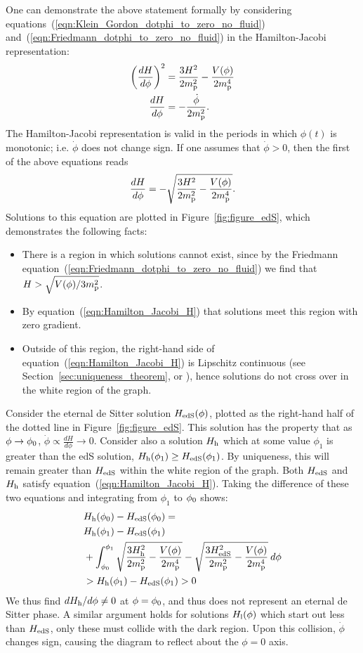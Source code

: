 One can demonstrate the above statement formally by considering equations~(\ref{eqn:Klein_Gordon_dotphi_to_zero_no_fluid}) and~(\ref{eqn:Friedmann_dotphi_to_zero_no_fluid}) in the Hamilton-Jacobi representation:
%
\begin{align}
  \left(\frac{dH}{d\phi}\right)^2
  &=
  \frac{3H^2}{2m_{\mathrm{p}}^2} - \frac{V(\phi)}{2m_{\mathrm{p}}^4}
  \\
  \frac{dH}{d\phi}
  &=
  -\frac{\dot{\phi}}{2m_{\mathrm{p}}^2}.
\end{align}
%
The Hamilton-Jacobi representation is valid in the periods in which $\phi(t)$ is monotonic; i.e. $\dot{\phi}$ does not change sign. If one assumes that $\dot{\phi}>0$, then the first of the above equations reads
%
\begin{equation}
  \frac{dH}{d\phi} 
  = 
  -\sqrt{\frac{3H^2}{2m_{\mathrm{p}}^2} - \frac{V(\phi)}{2m_{\mathrm{p}}^4}}.
  \label{eqn:Hamilton_Jacobi_H}
\end{equation}
%
Solutions to this equation are plotted in Figure~\ref{fig:figure_edS}, which demonstrates the following facts: 
%
\begin{itemize}
  \item There is a region in which solutions cannot exist, since by the Friedmann equation~(\ref{eqn:Friedmann_dotphi_to_zero_no_fluid}) we find that $H>\sqrt{V(\phi)/3m_{\mathrm{p}}^2}$.
  \item  By equation~(\ref{eqn:Hamilton_Jacobi_H}) that solutions meet this region with zero gradient.
  \item Outside of this region, the right-hand side of equation~(\ref{eqn:Hamilton_Jacobi_H}) is Lipschitz continuous (see Section~\ref{sec:uniqueness_theorem}, or \citet{agarwal_1993}), hence solutions do not cross over in the white region of the graph.
\end{itemize}
% 

Consider the eternal de Sitter solution $H_\mathrm{edS}(\phi)$, plotted as the right-hand half of the dotted line in Figure~\ref{fig:figure_edS}.  This solution has the property that as $\phi\to\phi_0$, $\dot{\phi}\propto\frac{dH}{d\phi}\to0$. Consider also a solution $H_\mathrm{h}$ which at some value $\phi_1$ is greater than the edS solution, $H_\mathrm{h}(\phi_1) \ge H_\mathrm{edS}(\phi_1)$. By uniqueness, this will remain greater than $H_\mathrm{edS}$ within the white region of the graph. Both $H_\mathrm{edS}$ and $H_\mathrm{h}$ satisfy equation~(\ref{eqn:Hamilton_Jacobi_H}).  Taking the difference of these two equations and integrating from $\phi_1$ to $\phi_0$ shows:
%
\begin{align}
  &H_\mathrm{h}(\phi_0)-H_\mathrm{edS}(\phi_0)= \nonumber\\
  &H_\mathrm{h}(\phi_1)-H_\mathrm{edS}(\phi_1) \nonumber\\
  & + \int_{\phi_0}^{\phi_1} 
  \sqrt{\frac{3H_\mathrm{h}^2}{2m_{\mathrm{p}}^2} - 
  \frac{V(\phi)}{2m_{\mathrm{p}}^4}}-\sqrt{\frac{3H_\mathrm{edS}^2}{2m_{\mathrm{p}}^2} - 
  \frac{V(\phi)}{2m_{\mathrm{p}}^4}}\:d\phi \nonumber \\
  &>H_\mathrm{h}(\phi_1)-H_\mathrm{edS}(\phi_1)>0 \nonumber
\end{align}
%
We thus find ${dH_\mathrm{h}}/{d\phi}\ne0$ at $\phi=\phi_0$, and thus does not represent an eternal de Sitter phase. A similar argument holds for solutions $H_\mathrm{l}(\phi)$ which start out less than $H_\mathrm{edS}$, only these must collide with the dark region. Upon this collision, $\dot{\phi}$ changes sign, causing the diagram to reflect about the $\phi=0$ axis.

